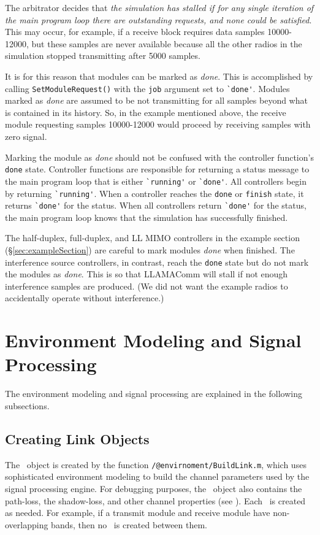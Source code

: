 The arbitrator decides that \emph{the simulation has stalled if for
any single iteration of the main program loop there are outstanding
requests, and none could be satisfied}.  This may occur, for
example, if a receive block requires data samples 10000-12000, but
these samples are never available because all the other radios in
the simulation stopped transmitting after 5000 samples.

It is for this reason that modules can be marked as \emph{done}.
This is accomplished by calling \verb+SetModuleRequest()+ with the
\verb+job+ argument set to \verb+`done'+.  Modules marked as
\emph{done} are assumed to be not transmitting for all samples
beyond what is contained in its history. So, in the example
mentioned above, the receive module requesting samples 10000-12000
would proceed by receiving samples with zero signal.

Marking the module as \emph{done} should not be confused with the
controller function's \verb+done+ state. Controller functions are
responsible for returning a status message to the main program loop
that is either \verb+`running'+ or \verb+`done'+.  All controllers
begin by returning \verb+`running'+.  When a controller reaches the
\verb+done+ or \verb+finish+ state, it returns \verb+`done'+ for the
status. When all controllers return \verb+`done'+ for the status,
the main program loop knows that the simulation has successfully
finished.

The half-duplex, full-duplex, and LL MIMO controllers in the example
section (\S\ref{sec:exampleSection}) are careful to mark modules
\emph{done} when finished.  The interference source controllers, in
contrast, reach the \verb+done+ state but do not mark the modules as
\emph{done}. This is so that LLAMAComm will stall if not enough
interference samples are produced.  (We did not want the example
radios to accidentally operate without interference.)

\section{Environment Modeling and Signal Processing}

The environment modeling and signal processing are explained in the following
subsections.

\subsection{Creating Link Objects} The \link\ object is created by the function
\verb+/@envirnoment/BuildLink.m+, which uses sophisticated environment modeling
to build the channel parameters used by the signal processing engine.  For
debugging purposes, the \link\ object also contains the path-loss, the
shadow-loss, and other channel properties (see ).%
Each \link\ is created as needed. For example, if a
transmit module and receive module have non-overlapping bands, then no \link\
is created between them.

